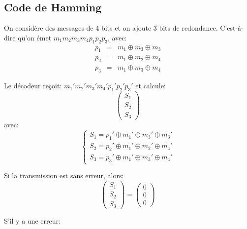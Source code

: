 \documentclass[a4paper,10pt,twocolumn]{article}
\theoremstyle{break}
\begin{document}
\subsection{Code de Hamming}
On considère des messages de 4 bits et on ajoute 3 bits de redondance. C'est-à-dire qu'on émet $m_1 m_2 m_3 m_4 p_1 p_2 p_3$, avec:
\begin{eqnarray*}
p_1 & = & m_1 \oplus m_3 \oplus m_3 \\
p_2 & = & m_1 \oplus m_2 \oplus m_4 \\
p_3 & = & m_1 \oplus m_3 \oplus m_4 
\end{eqnarray*}

Le décodeur reçoit: $m_1' m_2' m_3' m_4' p_1' p_2' p_3'$ et calcule:
$$ \left(\begin{array}{c}
 S_1\\
 S_2\\
 S_3
\end{array}\right) $$
avec: 
$$\left\lbrace
\begin{array}{c}
S_1 = p_1' \oplus m_1' \oplus m_3' \oplus m_3' \\
S_2 = p_2' \oplus m_1' \oplus m_2' \oplus m_4' \\
S_3 = p_3' \oplus m_1' \oplus m_3' \oplus m_4' 
\end{array}\right.$$

Si la transmission est sans erreur, alors:
$$ \left(\begin{array}{c}
 S_1\\
 S_2\\
 S_3
\end{array}\right) =
 \left(\begin{array}{c}
 0\\
 0\\
 0
\end{array}\right) $$

S'il y a une erreur:
\end{document}
